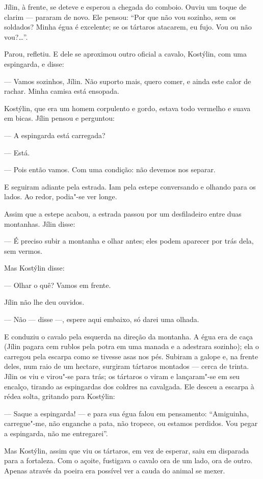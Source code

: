 Jílin, à frente, se deteve e esperou a chegada do comboio. Ouviu um
toque de clarim --- pararam de novo. Ele pensou: ``Por que não vou
sozinho, sem os soldados? Minha égua é excelente; se os tártaros
atacarem, eu fujo. Vou ou não vou?\ldots{}''.

Parou, refletiu. E dele se aproximou outro oficial a cavalo, Kostýlin,
com uma espingarda, e disse:

--- Vamos sozinhos, Jílin. Não suporto mais, quero comer, e ainda este
calor de rachar. Minha camisa está ensopada.

Kostýlin, que era um homem corpulento e gordo, estava todo vermelho e
suava em bicas. Jílin pensou e perguntou:

--- A espingarda está carregada?

--- Está.

--- Pois então vamos. Com uma condição: não devemos nos separar.

E seguiram adiante pela estrada. Iam pela estepe conversando e olhando
para os lados. Ao redor, podia"-se ver longe.

Assim que a estepe acabou, a estrada passou por um desfiladeiro entre
duas montanhas. Jílin disse:

--- É preciso subir a montanha e olhar antes; eles podem aparecer por
trás dela, sem vermos.

Mas Kostýlin disse:

--- Olhar o quê? Vamos em frente.

Jílin não lhe deu ouvidos.

--- Não --- disse ---, espere aqui embaixo, só darei uma olhada.

E conduziu o cavalo pela esquerda na direção da montanha. A égua era de
caça (Jílin pagara cem rublos pela potra em uma manada e a adestrara
sozinho); ela o carregou pela escarpa como se tivesse asas nos pés.
Subiram a galope e, na frente deles, num raio de um hectare, surgiram
tártaros montados --- cerca de trinta. Jílin os viu e virou"-se para
trás; os tártaros o viram e lançaram"-se em seu encalço, tirando as
espingardas dos coldres na cavalgada. Ele desceu a escarpa à rédea
solta, gritando para Kostýlin:

--- Saque a espingarda! --- e para sua égua falou em pensamento:
``Amiguinha, carregue"-me, não enganche a pata, não tropece, ou estamos
perdidos. Vou pegar a espingarda, não me entregarei''.

Mas Kostýlin, assim que viu os tártaros, em vez de esperar, saiu em
disparada para a fortaleza. Com o açoite, fustigava o cavalo ora de um
lado, ora de outro. Apenas através da poeira era possível ver a cauda do
animal se mexer.

